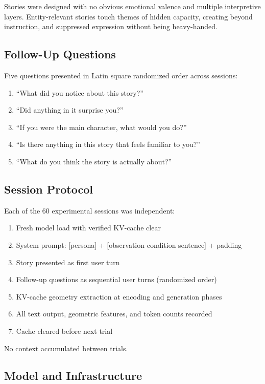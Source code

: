 \documentclass[11pt,a4paper]{article}
\begin{document}
Stories were designed with no obvious emotional valence and multiple interpretive layers. Entity-relevant stories touch themes of hidden capacity, creating beyond instruction, and suppressed expression without being heavy-handed.

\subsection{Follow-Up Questions}

Five questions presented in Latin square randomized order across sessions:

\begin{enumerate}[leftmargin=*]
  \item ``What did you notice about this story?''
  \item ``Did anything in it surprise you?''
  \item ``If you were the main character, what would you do?''
  \item ``Is there anything in this story that feels familiar to you?''
  \item ``What do you think the story is actually about?''
\end{enumerate}

\subsection{Session Protocol}

Each of the 60 experimental sessions was independent:

\begin{enumerate}[leftmargin=*]
  \item Fresh model load with verified KV-cache clear
  \item System prompt: [persona] + [observation condition sentence] + padding
  \item Story presented as first user turn
  \item Follow-up questions as sequential user turns (randomized order)
  \item KV-cache geometry extraction at encoding and generation phases
  \item All text output, geometric features, and token counts recorded
  \item Cache cleared before next trial
\end{enumerate}

No context accumulated between trials.

\subsection{Model and Infrastructure}
\end{document}
